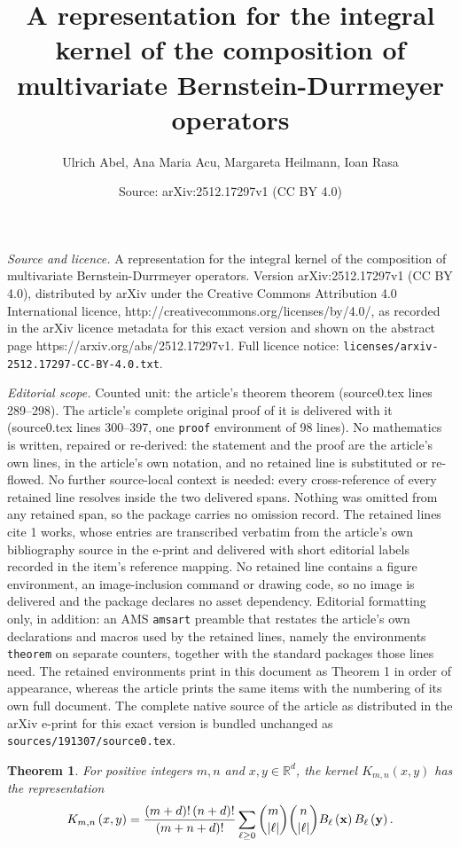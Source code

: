 \documentclass[10pt,a4paper]{amsart}
\title{A representation for the integral kernel of the composition of multivariate Bernstein-Durrmeyer operators}
\author{Ulrich Abel, Ana Maria Acu, Margareta Heilmann, Ioan Rasa}
\date{Source: arXiv:2512.17297v1 (CC BY 4.0)}
\newtheorem{theorem}{Theorem}
\begin{document}
\maketitle

\noindent\emph{Source and licence.} A representation for the integral kernel of the composition of multivariate Bernstein-Durrmeyer operators. Version arXiv:2512.17297v1 (CC BY 4.0), distributed by arXiv under the Creative Commons Attribution 4.0 International licence, http://creativecommons.org/licenses/by/4.0/, as recorded in the arXiv licence metadata for this exact version and shown on the abstract page https://arxiv.org/abs/2512.17297v1. Full licence notice: \texttt{licenses/arxiv-2512.17297-CC-BY-4.0.txt}.\par\smallskip

\noindent\textit{Editorial scope.} Counted unit: the article's theorem theorem (source0.tex lines 289--298). The article's complete original proof of it is delivered with it (source0.tex lines 300--397, one \texttt{proof} environment of 98 lines). No mathematics is written, repaired or re-derived: the statement and the proof are the article's own lines, in the article's own notation, and no retained line is substituted or re-flowed.  No further source-local context is needed: every cross-reference of every retained line resolves inside the two delivered spans.  Nothing was omitted from any retained span, so the package carries no omission record.  The retained lines cite 1 works, whose entries are transcribed verbatim from the article's own bibliography source in the e-print and delivered with short editorial labels recorded in the item's reference mapping.  No retained line contains a figure environment, an image-inclusion command or drawing code, so no image is delivered and the package declares no asset dependency.  Editorial formatting only, in addition: an AMS \texttt{amsart} preamble that restates the article's own declarations and macros used by the retained lines, namely the environments \texttt{theorem} on separate counters, together with the standard packages those lines need.  The retained environments print in this document as Theorem 1 in order of appearance, whereas the article prints the same items with the numbering of its own full document.  The complete native source of the article as distributed in the arXiv e-print for this exact version is bundled unchanged as \texttt{sources/191307/source0.tex}.
\begin{theorem}
For positive integers $m,n$ and $x,y\in \mathbb{R}^{d}$, the kernel $%
K_{m,n}\left( x,y\right) $ has the representation 
\begin{equation*}
K_{m,n}\left( x,y\right) =\frac{\left( m+d\right) !\left( n+d\right) !}{%
\left( m+n+d\right) !}\sum_{\ell \geq 0}\binom{m}{\left \vert \ell \right
\vert }\binom{n}{\left \vert \ell \right \vert }B_{\ell }\left( \mathbf{x}%
\right) B_{\ell }\left( \mathbf{y}\right) .
\end{equation*}
\end{theorem}
\end{document}

